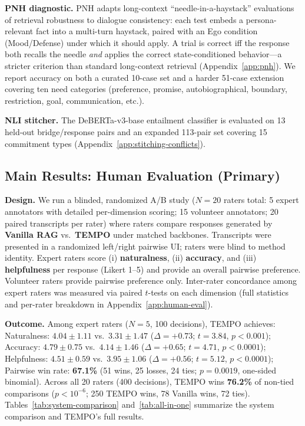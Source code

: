 \documentclass[11pt]{article}
\begin{document}
\textbf{PNH diagnostic.} PNH adapts long-context ``needle-in-a-haystack'' evaluations of retrieval robustness \cite{liu2024lostmiddle} to dialogue consistency: each test embeds a persona-relevant fact into a multi-turn haystack, paired with an Ego condition (Mood/Defense) under which it should apply. A trial is correct iff the response both recalls the needle \emph{and} applies the correct state-conditioned behavior---a stricter criterion than standard long-context retrieval (Appendix~\ref{app:pnh}). We report accuracy on both a curated 10-case set and a harder 51-case extension covering ten need categories (preference, promise, autobiographical, boundary, restriction, goal, communication, etc.).

\textbf{NLI stitcher.} The DeBERTa-v3-base entailment classifier is evaluated on 13 held-out bridge/response pairs and an expanded 113-pair set covering 15 commitment types (Appendix~\ref{app:stitching-conflicts}).

\subsection{Main Results: Human Evaluation (Primary)}
\label{sec:human-main}
\textbf{Design.}
We run a blinded, randomized A/B study ($N{=}20$ raters total: 5 expert annotators with detailed per-dimension scoring; 15 volunteer annotators; 20 paired transcripts per rater) where raters compare responses generated by \textbf{Vanilla RAG} vs.\ \textbf{TEMPO} under matched backbones. Transcripts were presented in a randomized left/right pairwise UI; raters were blind to method identity.
Expert raters score (i) \textbf{naturalness}, (ii) \textbf{accuracy}, and (iii) \textbf{helpfulness} per response (Likert 1--5) and provide an overall pairwise preference. Volunteer raters provide pairwise preference only. Inter-rater concordance among expert raters was measured via paired $t$-tests on each dimension (full statistics and per-rater breakdown in Appendix~\ref{app:human-eval}).

\textbf{Outcome.}
Among expert raters ($N{=}5$, 100 decisions), TEMPO achieves:
Naturalness: $4.04{\pm}1.11$ vs.\ $3.31{\pm}1.47$ ($\Delta{=}{+0.73}$; $t{=}3.84$, $p{<}0.001$);
Accuracy: $4.79{\pm}0.75$ vs.\ $4.14{\pm}1.46$ ($\Delta{=}{+0.65}$; $t{=}4.71$, $p{<}0.0001$);
Helpfulness: $4.51{\pm}0.59$ vs.\ $3.95{\pm}1.06$ ($\Delta{=}{+0.56}$; $t{=}5.12$, $p{<}0.0001$);
Pairwise win rate: \textbf{67.1\%} (51 wins, 25 losses, 24 ties; $p{=}0.0019$, one-sided binomial).
Across all 20 raters (400 decisions), TEMPO wins \textbf{76.2\%} of non-tied comparisons ($p{<}10^{-6}$; 250 TEMPO wins, 78 Vanilla wins, 72 ties).
Tables~\ref{tab:system-comparison} and~\ref{tab:all-in-one} summarize the system comparison and TEMPO's full results.
\end{document}
